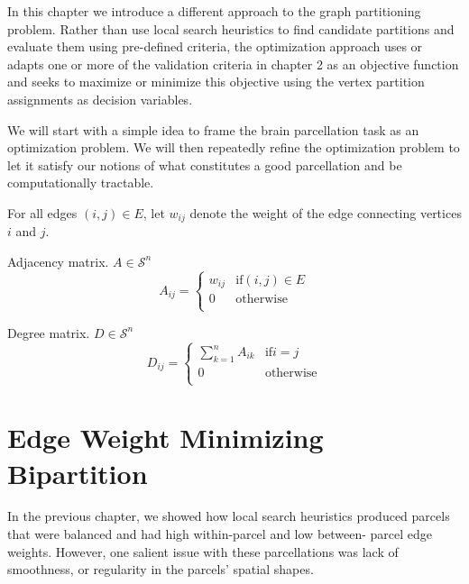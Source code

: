 
In this chapter we introduce a different approach to the graph
partitioning problem. Rather than use local search heuristics to find
candidate partitions and evaluate them using pre-defined criteria, the
optimization approach uses or adapts one or more of the validation
criteria in chapter 2 as an objective function and seeks to maximize or
minimize this objective using the vertex partition assignments as
decision variables.

We will start with a simple idea to frame the brain parcellation task as
an optimization problem. We will then repeatedly refine the optimization
problem to let it satisfy our notions of what constitutes a good
parcellation and be computationally tractable. 

For all edges $(i,j) \in E$, let $w_{ij}$ denote the weight of the edge
connecting vertices $i$ and $j$.

\begin{definition}
Adjacency matrix. $A \in \mathcal{S}^n$
\[
A_{ij} = \begin{cases}
  w_{ij} & \text{if} (i,j) \in E \\
  0      & \text{otherwise} \\
\end{cases}
\]
\end{definition}

\begin{definition}
Degree matrix. $D \in \mathcal{S}^n$
\[
D_{ij} = \begin{cases}
  \sum_{k = 1}^n A_{ik} & \text{if} i = j \\
  0                     & \text{otherwise} \\
\end{cases}
\]
\end{definition}

\section{Edge Weight Minimizing Bipartition}

In the previous chapter, we showed how local search heuristics produced
parcels that were balanced and had high within-parcel and low between-
parcel edge weights. However, one salient issue with these parcellations
was lack of smoothness, or regularity in the parcels' spatial shapes.

